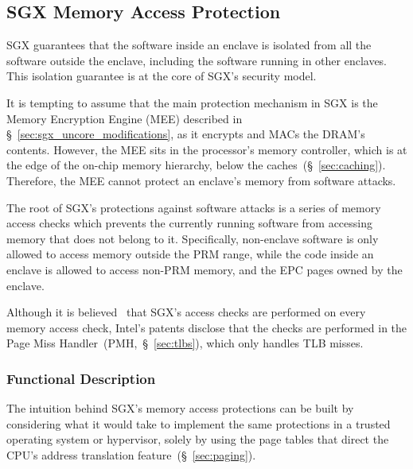 \subsection{SGX Memory Access Protection}
\label{sec:sgx_access_protection}

SGX guarantees that the software inside an enclave is isolated from all the
software outside the enclave, including the software running in other enclaves.
This isolation guarantee is at the core of SGX's security model.

It is tempting to assume that the main protection mechanism in SGX is the
Memory Encryption Engine (MEE) described in
\S~\ref{sec:sgx_uncore_modifications}, as it encrypts and MACs the DRAM's
contents. However, the MEE sits in the processor's memory controller, which is
at the edge of the on-chip memory hierarchy, below the
caches~(\S~\ref{sec:caching}). Therefore, the MEE cannot protect an enclave's
memory from software attacks.


The root of SGX's protections against software attacks is a series of memory
access checks which prevents the currently running software from accessing
memory that does not belong to it. Specifically, non-enclave software is only
allowed to access memory outside the PRM range, while the code inside an
enclave is allowed to access non-PRM memory, and the EPC pages owned by the
enclave.


Although it is believed~\cite{evtyushkin2014isox} that SGX's access checks are
performed on every memory access check, Intel's patents disclose that the
checks are performed in the Page Miss Handler~(PMH,~\S~\ref{sec:tlbs}), which
only handles TLB misses.


\subsubsection{Functional Description}
\label{sec:sgx_access_concepts}

The intuition behind SGX's memory access protections can be built by
considering what it would take to implement the same protections in a trusted
operating system or hypervisor, solely by using the page tables that direct the
CPU's address translation feature~(\S~\ref{sec:paging}).

